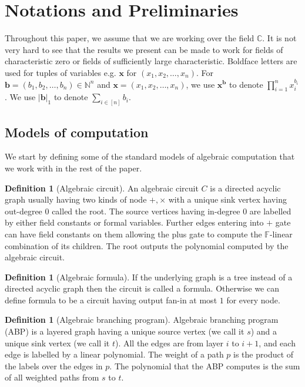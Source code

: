 \documentclass[10pt,a4paper]{article}
\theoremstyle{definition}
\newtheorem{definition}[theorem]{Definition}
\newcommand{\F}{\mathbb C}
\newcommand{\N}{\mathbb N}
\newcommand{\vb}{\mathbf b}
\newcommand{\vx}{\mathbf x}
\begin{document}
\setcounter{section}{1}

\section{Notations and Preliminaries}
\label{sec:prelims}
Throughout this paper, we assume that we are working over the field $\F$. It is not very hard to see that the results we present can be made to work for fields of characteristic zero or fields of sufficiently large characteristic. Boldface letters are used for tuples of variables e.g. $\vx$ for $(x_1, x_2, \ldots, x_n)$. For $\vb = (b_1, b_2, \ldots, b_n) \in \N^n$ and $\vx = (x_1, x_2, \ldots, x_n)$, we use  $\vx^{\vb}$ to denote  $\prod_{i = 1}^n x_i^{b_i}$. 
We use $|\vb|_1$ to denote $\sum_{i \in [n]} b_i$. %

\subsection{Models of computation}
We start by defining some of the standard models of algebraic computation that we work with in the rest of the paper. 
\begin{definition}[Algebraic circuit]	
	An algebraic circuit $C$ is a directed acyclic graph usually having two kinds of node $+,\times$ with a unique sink vertex having out-degree $0$ called the root. The source vertices having in-degree $0$ are labelled by either field constants or formal variables. Further edges entering into $+$ gate can have field constants on them allowing the plus gate to compute the $\mathbb{F}$-linear combination of its children. The root outputs the polynomial computed by the algebraic circuit. 
\end{definition}

\begin{definition}[Algebraic formula]
	If the underlying graph is a tree instead of a directed acyclic graph then the circuit is called a formula. Otherwise we can define formula to be a circuit having output fan-in at most $1$ for every node.
\end{definition}

\begin{definition}[Algebraic branching program]
	Algebraic branching program (ABP) is a layered graph having a unique source vertex (we call it $s$) and a unique sink vertex (we call it $t$). All the edges are from layer $i$ to $i+1$, and each edge is labelled by a linear polynomial. The weight of a path $p$ is the product of the labels over the edges in $p$. The polynomial that the ABP computes is the sum of all weighted paths from $s$ to $t$. 
\end{definition}
\end{document}
